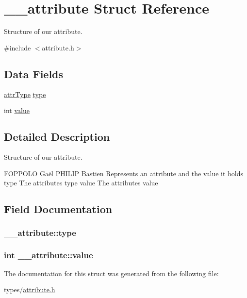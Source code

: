 \hypertarget{struct____attribute}{}\section{\+\_\+\+\_\+attribute Struct Reference}
\label{struct____attribute}


Structure of our attribute.  




{\ttfamily \#include $<$attribute.\+h$>$}

\subsection*{Data Fields}
\begin{DoxyCompactItemize}
\item 
\hyperlink{attribute-types_8h_a8ed2f1d0c280dd48cac531e6b26ef8fc}{attr\+Type} \hyperlink{struct____attribute_a7a85e6655765aba3014d524a393208a8}{type}
\item 
int \hyperlink{struct____attribute_a37f94adbb96899d1f61f40fb98e655cc}{value}
\end{DoxyCompactItemize}


\subsection{Detailed Description}
Structure of our attribute. 

F\+O\+P\+P\+O\+LO Gaël  P\+H\+I\+L\+IP Bastien Represents an attribute and the value it holds  type The attribute\textquotesingle{}s type  value The attribute\textquotesingle{}s value 

\subsection{Field Documentation}
\subsubsection[{\texorpdfstring{type}{type}}]{ \+\_\+\+\_\+attribute\+::type}\hypertarget{struct____attribute_a7a85e6655765aba3014d524a393208a8}{}\label{struct____attribute_a7a85e6655765aba3014d524a393208a8}
\subsubsection[{\texorpdfstring{value}{value}}]{\setlength{\rightskip}{0pt plus 5cm}int \+\_\+\+\_\+attribute\+::value}\hypertarget{struct____attribute_a37f94adbb96899d1f61f40fb98e655cc}{}\label{struct____attribute_a37f94adbb96899d1f61f40fb98e655cc}


The documentation for this struct was generated from the following file\+:\begin{DoxyCompactItemize}
\item 
types/\hyperlink{attribute_8h}{attribute.\+h}\end{DoxyCompactItemize}
